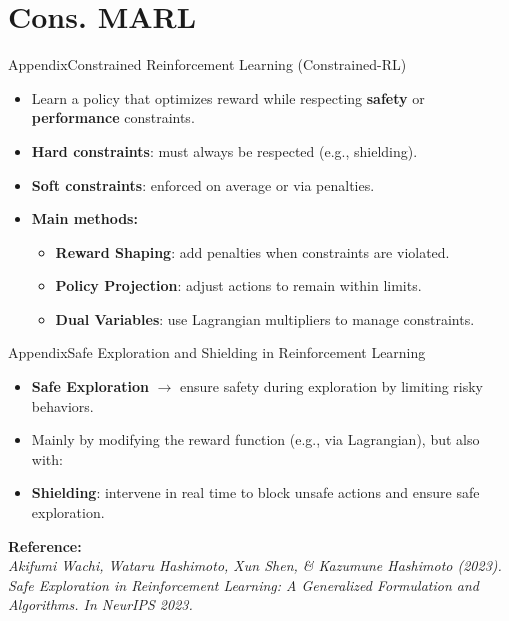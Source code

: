 \section{Cons. MARL}

\begin{frame}{Appendix}{Constrained Reinforcement Learning (Constrained-RL)}

    \begin{itemize}
        \item Learn a policy that optimizes reward while respecting \textbf{safety} or \textbf{performance} constraints.

        \item \textbf{Hard constraints}: must always be respected (e.g., shielding).
        \item \textbf{Soft constraints}: enforced on average or via penalties.

        \item \textbf{Main methods:}
              \begin{itemize}
                  \item \textbf{Reward Shaping}: add penalties when constraints are violated.
                  \item \textbf{Policy Projection}: adjust actions to remain within limits.
                  \item \textbf{Dual Variables}: use Lagrangian multipliers to manage constraints.
              \end{itemize}

    \end{itemize}
\end{frame}

\begin{frame}{Appendix}{Safe Exploration and Shielding in Reinforcement Learning}

    \begin{itemize}
        \item \textbf{Safe Exploration} $\rightarrow$ ensure safety during exploration by limiting risky behaviors.
        \item Mainly by modifying the reward function (e.g., via Lagrangian), but also with:
        \item \textbf{Shielding}: intervene in real time to block unsafe actions and ensure safe exploration.
    \end{itemize}

    \textbf{Reference:} \\
    \textit{Akifumi Wachi, Wataru Hashimoto, Xun Shen, \& Kazumune Hashimoto (2023). Safe Exploration in Reinforcement Learning: A Generalized Formulation and Algorithms. In NeurIPS 2023.}

\end{frame}
